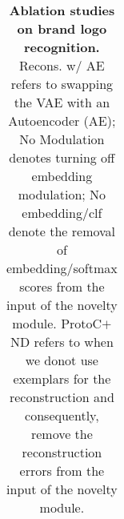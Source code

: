 \begin{table}[ht]
{\begin{tabular}{@{}lcccc@{}}
\bottomrule
\end{tabular}
}
\caption{\textbf{Ablation studies on brand logo recognition.} Recons. w/ AE refers to swapping the VAE with an Autoencoder (AE); No Modulation denotes turning off embedding modulation; No embedding/clf denote the removal of embedding/softmax scores from the input of the novelty module. ProtoC$+$ND refers to when we donot use exemplars for the reconstruction and consequently, remove the reconstruction errors from the input of the novelty module.}

\label{tab:ablation_belga_whole}
\end{table}